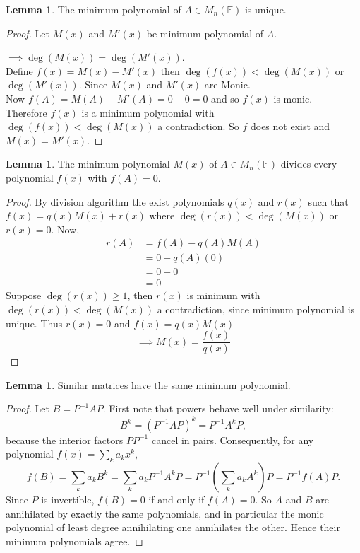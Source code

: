 \documentclass[11pt,a4paper]{article}
\theoremstyle{definition}
\newtheorem{lem}[thm]{Lemma}
\begin{document}
\begin{lem}
The minimum polynomial of $A\in M_n(\mathbb{F})$ is unique.
\end{lem}


\begin{proof}
Let $M(x)$ and $M'(x)$ be minimum polynomial of $A$.

$\implies \deg(M(x))=\deg (M'(x))$.\\ Define $f(x)=M(x)-M'(x)$ then $\deg (f(x))<\deg (M(x))$ or $\deg (M'(x))$. Since $M(x)$ and $M'(x)$ are Monic.\\ Now $f(A)=M(A)-M'(A)=0-0=0$ and so $f(x)$ is monic.\\ Therefore $f(x)$ is a minimum polynomial with $\deg (f(x))<\deg (M(x))$ a contradiction. So $f$ does not exist and $M(x)=M'(x)$.
\end{proof}


\begin{lem}\label{lem:min-poly-divides}
The minimum polynomial $M(x)$ of $A\in M_n(\mathbb{F})$ divides every polynomial $f(x)$ with $f(A)=0$.
\end{lem}


\begin{proof}
By division algorithm the exist polynomials $q(x)$ and $r(x)$ such that $f(x)=q(x)M(x)+r(x)$ where $\deg (r(x))<\deg (M(x))$ or $r(x)=0$. Now,
\begin{align*}
r(A) &=f(A)-q(A)M(A)\\
     &=0-q(A)(0)\\
     &=0-0\\
     &=0
\end{align*}
Suppose $\deg (r(x))\geq 1$, then $r(x)$ is minimum with $\deg (r(x))<\deg (M(x))$ a contradiction, since minimum polynomial is unique. Thus $r(x)=0$ and $f(x)=q(x)M(x)$ $$\implies M(x)=\frac{f(x)}{q(x)}$$
\end{proof}


\begin{lem}\label{lem:similar-min-poly}
Similar matrices have the same minimum polynomial.
\end{lem}

\begin{proof}
Let $B=P^{-1}AP$. First note that powers behave well under similarity:
$$B^k=(P^{-1}AP)^k=P^{-1}A^kP,$$
because the interior factors $PP^{-1}$ cancel in pairs. Consequently, for any
polynomial $f(x)=\sum_k a_kx^k$,
$$f(B)=\sum_k a_kB^k=\sum_k a_kP^{-1}A^kP=P^{-1}\left(\sum_k a_kA^k\right)P
=P^{-1}f(A)P.$$
Since $P$ is invertible, $f(B)=0$ if and only if $f(A)=0$. So $A$ and $B$ are
annihilated by exactly the same polynomials, and in particular the monic
polynomial of least degree annihilating one annihilates the other. Hence their
minimum polynomials agree.
\end{proof}
\end{document}
